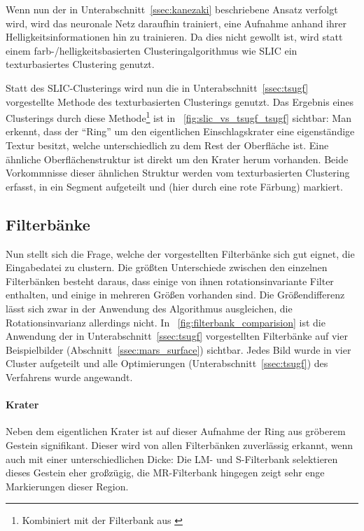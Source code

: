 Wenn nun der in Unterabschnitt~\ref{ssec:kanezaki} beschriebene Ansatz verfolgt wird, wird das neuronale Netz daraufhin trainiert, eine Aufnahme anhand ihrer Helligkeitsinformationen hin zu trainieren. Da dies nicht gewollt ist, wird statt einem farb-/helligkeitsbasierten Clusteringalgorithmus wie SLIC ein texturbasiertes Clustering genutzt.

Statt des SLIC-Clusterings wird nun die in Unterabschnitt~\ref{ssec:tsugf} vorgestellte Methode des texturbasierten Clusterings genutzt. Das Ergebnis eines Clusterings durch diese Methode\footnote{Kombiniert mit der Filterbank aus \cite{jain_91}} ist in \figurename~\ref{fig:slic_vs_tsugf_tsugf} sichtbar: Man erkennt, dass der \enquote{Ring} um den eigentlichen Einschlagskrater eine eigenständige Textur besitzt, welche unterschiedlich zu dem Rest der Oberfläche ist. Eine ähnliche Oberflächenstruktur ist direkt um den Krater herum vorhanden. Beide Vorkommnisse dieser ähnlichen Struktur werden vom texturbasierten Clustering erfasst, in ein Segment aufgeteilt und (hier durch eine rote Färbung) markiert.

\subsection{Filterbänke}

Nun stellt sich die Frage, welche der vorgestellten Filterbänke sich gut eignet, die Eingabedatei zu clustern. Die größten Unterschiede zwischen den einzelnen Filterbänken besteht daraus, dass einige von ihnen rotationsinvariante Filter enthalten, und einige in mehreren Größen vorhanden sind. Die Größendifferenz lässt sich zwar in der Anwendung des Algorithmus ausgleichen, die Rotationsinvarianz allerdings nicht. In \figurename~\ref{fig:filterbank_comparision} ist die Anwendung der in Unterabschnitt~\ref{ssec:tsugf} vorgestellten Filterbänke auf vier Beispielbilder (\vgl Abschnitt~\ref{ssec:mars_surface}) sichtbar. Jedes Bild wurde in vier Cluster aufgeteilt und alle Optimierungen (\vgl Unterabschnitt~\ref{ssec:tsugf}) des Verfahrens wurde angewandt.

\paragraph{Krater}
Neben dem eigentlichen Krater ist auf dieser Aufnahme der Ring aus gröberem Gestein signifikant. Dieser wird von allen Filterbänken zuverlässig erkannt, wenn auch mit einer unterschiedlichen Dicke: Die LM- und S-Filterbank selektieren dieses Gestein eher großzügig, die MR-Filterbank hingegen zeigt sehr enge Markierungen dieser Region.

